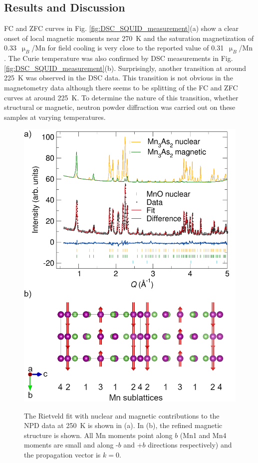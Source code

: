 \documentclass[10pt,doublespacing,edeposit]{uiucthesis2020}
\begin{document}
\begin{mainmatter}
\section{Results and Discussion}


FC and ZFC curves in Fig. \ref{fig:DSC_SQUID_measurement}(a) show a clear onset of local magnetic moments near 270~K and the saturation magnetization of 0.33~$\upmu_B$/Mn for field cooling is very close to the reported value of 0.31~$\upmu_B$/Mn \cite{Yuzuri1960}. The Curie temperature was also confirmed by DSC measurements in Fig. \ref{fig:DSC_SQUID_measurement}(b). Surprisingly, another transition at around 225~K was observed in the DSC data. This transition is not obvious in the magnetometry data although there seems to be splitting of the FC and ZFC curves at around 225~K. To determine the nature of this transition, whether structural or magnetic, neutron powder diffraction was carried out on these samples at varying temperatures.

\begin{figure}
\centering\includegraphics[width=0.75\columnwidth]{figures/ch6/250K_mag_structure.png} \\
\caption{The Rietveld fit with nuclear and magnetic contributions to the NPD data at 250~K is shown in (a). In (b), the refined magnetic structure is shown. All Mn moments point along $b$ (Mn1 and Mn4 moments are small and along -$b$ and +$b$ directions respectively) and the propagation vector is $k = 0$. 
}
\label{fig:250K_data}
\end{figure}


\end{mainmatter}
\end{document}
